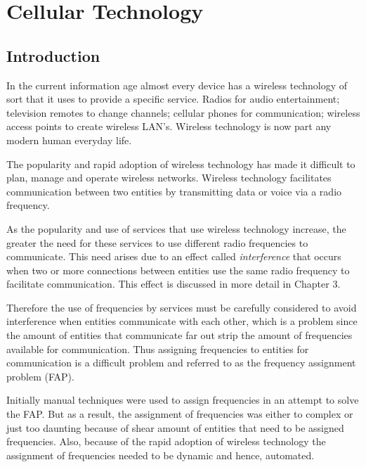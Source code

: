 \chapter{Cellular Technology}
\label{chpt:celltech}
\section{Introduction}
In the current information age  almost every device has a wireless technology of sort that it uses to provide a specific service. Radios for audio entertainment; television remotes to change channels; cellular phones for communication; wireless access points to create wireless LAN's\cite{Karen2004}. Wireless technology is now part any modern human everyday life.

The popularity and rapid adoption of wireless technology has made it difficult to plan, manage and operate wireless networks\cite{Karen2004,Eisenblatter,GSMArchitectureProtocolsServices,GSM92,wirelesstelcoMullet}. Wireless technology facilitates communication between two entities by transmitting data or voice via a radio frequency\cite{Karen2004,Eisenblatter,GSMArchitectureProtocolsServices,GSM92,wirelesstelcoMullet}. 

As the popularity and use of services that use wireless technology increase, the greater the need for these services to use different radio frequencies to communicate\cite{Karen2004,Eisenblatter,GSMArchitectureProtocolsServices,GSM92,wirelesstelcoMullet}. This need arises due to an effect called \emph{interference} that occurs when two or more connections between entities use the same radio frequency to facilitate communication\cite{Karen2004,Eisenblatter,GSMArchitectureProtocolsServices,GSM92,wirelesstelcoMullet}. This effect is discussed in more detail in Chapter 3.

Therefore the use of frequencies by services must be carefully considered to avoid interference when entities communicate with each other, which is a problem since the amount of entities that communicate far out strip the amount of frequencies available for communication\cite{Karen2004,Eisenblatter,GSMArchitectureProtocolsServices,GSM92,wirelesstelcoMullet}. Thus assigning frequencies to entities for communication is a difficult problem and referred to as the frequency assignment problem (FAP)\cite{Karen2004,Eisenblatter,GSMArchitectureProtocolsServices,GSM92,wirelesstelcoMullet}.

Initially manual techniques were used to assign frequencies in an attempt to solve the FAP\cite{Karen2004,Eisenblatter,GSMArchitectureProtocolsServices,GSM92,wirelesstelcoMullet}. But as a result, the assignment of frequencies was either to complex or just too daunting because of shear amount of entities that need to be assigned frequencies\cite{Karen2004,Eisenblatter,GSMArchitectureProtocolsServices,GSM92,wirelesstelcoMullet}. Also, because of the rapid adoption of wireless technology the assignment of frequencies needed to be dynamic and hence, automated\cite{Karen2004,Eisenblatter,GSMArchitectureProtocolsServices,GSM92,wirelesstelcoMullet}.

